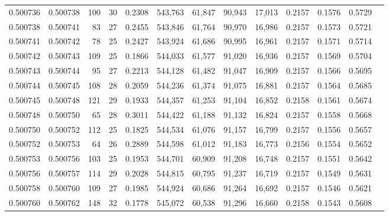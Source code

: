 \begin{tabular}{rrrrrrrrrrrrr}
0.500736 & 0.500738 & 100 &  30 &                                     0.2308 & 543,763 &  61,847 &  90,943 &  17,013 & 0.2157 & 0.1576 & 0.5729 \\
0.500738 & 0.500741 &  83 &  27 &                                     0.2455 & 543,846 &  61,764 &  90,970 &  16,986 & 0.2157 & 0.1573 & 0.5721 \\
0.500741 & 0.500742 &  78 &  25 &                                     0.2427 & 543,924 &  61,686 &  90,995 &  16,961 & 0.2157 & 0.1571 & 0.5714 \\
0.500742 & 0.500743 & 109 &  25 &                                     0.1866 & 544,033 &  61,577 &  91,020 &  16,936 & 0.2157 & 0.1569 & 0.5704 \\
0.500743 & 0.500744 &  95 &  27 &                                     0.2213 & 544,128 &  61,482 &  91,047 &  16,909 & 0.2157 & 0.1566 & 0.5695 \\
0.500744 & 0.500745 & 108 &  28 &                                     0.2059 & 544,236 &  61,374 &  91,075 &  16,881 & 0.2157 & 0.1564 & 0.5685 \\
0.500745 & 0.500748 & 121 &  29 &                                     0.1933 & 544,357 &  61,253 &  91,104 &  16,852 & 0.2158 & 0.1561 & 0.5674 \\
0.500748 & 0.500750 &  65 &  28 &                                     0.3011 & 544,422 &  61,188 &  91,132 &  16,824 & 0.2157 & 0.1558 & 0.5668 \\
0.500750 & 0.500752 & 112 &  25 &                                     0.1825 & 544,534 &  61,076 &  91,157 &  16,799 & 0.2157 & 0.1556 & 0.5657 \\
0.500752 & 0.500753 &  64 &  26 &                                     0.2889 & 544,598 &  61,012 &  91,183 &  16,773 & 0.2156 & 0.1554 & 0.5652 \\
0.500753 & 0.500756 & 103 &  25 &                                     0.1953 & 544,701 &  60,909 &  91,208 &  16,748 & 0.2157 & 0.1551 & 0.5642 \\
0.500756 & 0.500757 & 114 &  29 &                                     0.2028 & 544,815 &  60,795 &  91,237 &  16,719 & 0.2157 & 0.1549 & 0.5631 \\
0.500758 & 0.500760 & 109 &  27 &                                     0.1985 & 544,924 &  60,686 &  91,264 &  16,692 & 0.2157 & 0.1546 & 0.5621 \\
0.500760 & 0.500762 & 148 &  32 &                                     0.1778 & 545,072 &  60,538 &  91,296 &  16,660 & 0.2158 & 0.1543 & 0.5608 \\

\end{tabular}
